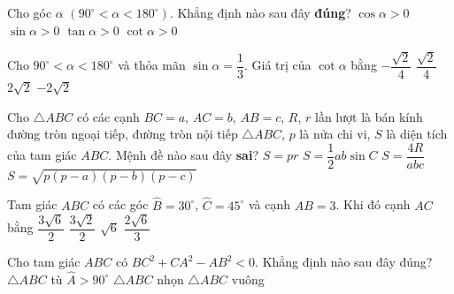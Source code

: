 \begin{ex}%
	Cho góc $\alpha$ $(90^\circ<\alpha<180^\circ)$. Khẳng định nào sau đây \textbf{đúng}?
	\choice
	{$\cos \alpha>0$}
	{\True $\sin \alpha>0$}
	{$\tan \alpha>0$}
	{$\cot \alpha>0$}
\end{ex}
\begin{ex}%
	Cho $90^\circ<\alpha<180^\circ$ và thỏa mãn $\sin \alpha=\dfrac{1}{3}$. Giá trị của $\cot \alpha$ bằng
	\choice
	{$-\dfrac{\sqrt{2}}{4}$}
	{$\dfrac{\sqrt{2}}{4}$}
	{$2\sqrt{2}$}
	{\True $-2\sqrt{2}$}
\end{ex}
\begin{ex}%
	Cho $\triangle ABC$ có các cạnh $BC=a$, $AC=b$, $AB=c$, $R$, $r$ lần lượt là bán kính đường tròn ngoại tiếp, đường tròn nội tiếp $\triangle ABC$, $p$ là nửa chi vi, $S$ là diện tích của tam giác $ABC$. Mệnh đề nào sau đây \textbf{sai}?
	\choice
	{$S=pr$}
	{$S=\dfrac{1}{2}ab\sin C$}
	{\True $S=\dfrac{4R}{abc}$}
	{$S=\sqrt{p(p-a)(p-b)(p-c)}$}
\end{ex}
\begin{ex}%
	Tam giác $ABC$ có các góc $\widehat{B}=30^\circ$, $\widehat{C}=45^\circ$ và cạnh $AB=3$. Khi đó cạnh $AC$ bằng
	\choice
	{$\dfrac{3\sqrt{6}}{2}$}
	{\True $\dfrac{3\sqrt{2}}{2}$}
	{$\sqrt{6}$}
	{$\dfrac{2\sqrt{6}}{3}$}
\end{ex}
\begin{ex}%
	Cho tam giác $ABC$ có $BC^2+CA^2-AB^2<0$. Khẳng định nào sau đây đúng?
	\choice
	{\True $\triangle ABC$ tù}
	{$\widehat{A}>90^\circ$}
	{$\triangle ABC$ nhọn}
	{$\triangle ABC$ vuông}
\end{ex}
